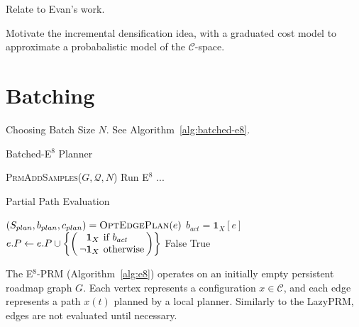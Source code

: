 Relate to Evan's work.

Motivate the incremental densification idea,
with a graduated cost model
to approximate a probabalistic model
of the $\mathcal{C}$-space.

\section{Batching}

Choosing Batch Size $N$.
See Algorithm~\ref{alg:batched-e8}.

\begin{algorithm}
\caption{Batched-E$^8$ Planner}
\label{alg:batched-e8}
\begin{algorithmic}[1]
\Loop
   \State \textsc{PrmAddSamples}($G, \mathcal{Q}, N$)
   \State Run E$^8$ ...
\EndLoop
\EndProcedure
\end{algorithmic}
\end{algorithm}

\begin{algorithm}
\caption{Partial Path Evaluation}
\label{alg:path-evaluation}
\begin{algorithmic}[1]
         \label{line:edge-evaluation-order}
      \State $(S_{plan}, b_{plan}, c_{plan})
         = \mbox{\textsc{OptEdgePlan}}(e)$
         \State $b_{act} = \mathbf{1}_X[e]$
         \State $\arraycolsep=2pt
            e.P \leftarrow e.P \cup
            \left\{\left( \begin{array}{rl}
            \mathbf{1}_X & \mbox{if } b_{act} \\
            \lnot \mathbf{1}_X & \mbox{otherwise} \\
            \end{array} \right)
            \right\}$
            \State \Return False
         \EndIf
      \EndFor
   \EndFor
   \State \Return True
\EndFunction
\end{algorithmic}
\end{algorithm}

The E$^8$-PRM (Algorithm~\ref{alg:e8})
operates on an initially empty persistent roadmap graph $G$.
Each vertex represents a configuration $x \in \mathcal{C}$,
and each edge represents a path $x(t)$ planned by a local planner.
Similarly to the LazyPRM,
edges are not evaluated until necessary.

